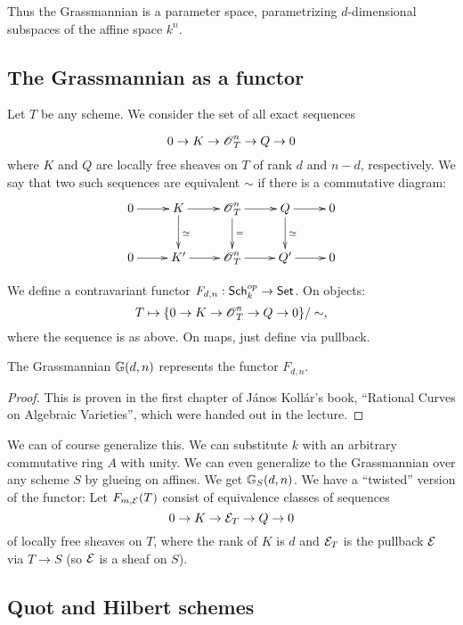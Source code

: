 \documentclass[11pt, english]{article}
\begin{document}
Thus the Grassmannian is a parameter space, parametrizing $d$-dimensional subspaces of the affine space $k^n$. 

\subsection{The Grassmannian as a functor}

Let $T$ be any scheme. We consider the set of all exact sequences 

\begin{equation}
\label{eq:eks}
0 \to K \to \operatorname{\mathscr{O}}_T^n \to Q \to 0
\end{equation}
where $K$ and $Q$ are locally free sheaves on $T$ of rank $d$ and $n-d$, respectively. We say that two such sequences are equivalent $\sim$ if there is a commutative diagram:
\[
\xymatrix{
0\ar[r]  & K \ar[r] \ar[d]^\simeq & \OO_T^n \ar[d]^= \ar[r] & Q \ar[r] \ar[d]^\simeq & 0 \\
0\ar[r]  & K^\prime \ar[r] & \OO_T^n  \ar[r] & Q^\prime \ar[r] & 0 \\
}
\]

\begin{defi}
We define a contravariant functor $F_{d,n}:\mathsf{Sch}_{k} ^{op} \to \mathsf{Set}$. On objects:
\[
T \mapsto \{ 0 \to K \to \operatorname{\mathscr{O}}_T^n \to Q \to 0 \} / \sim,
\]
where the sequence is as above. On maps, just define via pullback. 
\end{defi}

 
\begin{thm}
The Grassmannian $\mathbb{G}(d,n)$ represents the functor $F_{d,n}$. 
\end{thm}
\begin{proof}
This is proven in the first chapter of János Kollár's book, ``Rational Curves on Algebraic Varieties'', which were handed out in the lecture.
\end{proof}

We can of course generalize this. We can substitute $k$ with an arbitrary commutative ring $A$ with unity. We can even generalize to the Grassmannian over any scheme $S$ by glueing on affines. We get $\mathbb{G}_S(d,n)$. We have a ``twisted'' version of the functor: Let $F_{m,\mathcal E}(T)$ consist of equivalence classes of sequences
\[
0 \to K \to \mathcal E_T \to Q \to 0
\]
of locally free sheaves on $T$, where the rank of $K$ is $d$ and $\mathcal E_T$ is the pullback $\mathcal E$ via $T \to S$ (so $\mathcal E$ is a sheaf on $S$).

\subsection{Quot and Hilbert schemes}
\end{document}
